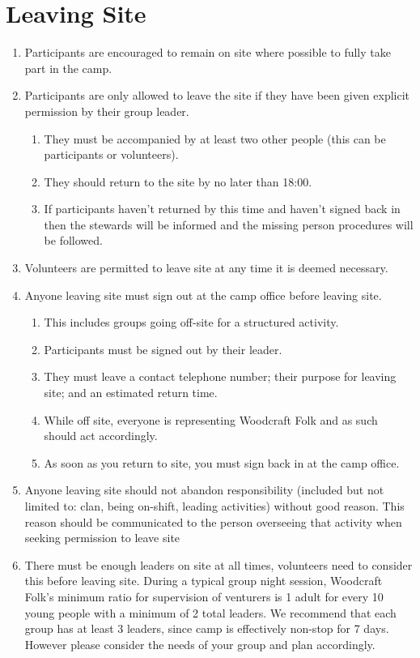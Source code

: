 \documentclass[a4paper, 11pt]{report}
\def\enumMarginIndentOne{4em}
\begin{document}
    \chapter{Leaving Site}
    \begin{enumerate}
        \item Participants are encouraged to remain on site where possible to fully take part in the camp.
        \item Participants are only allowed to leave the site if they have been given explicit permission by their group leader.
        \begin{enumerate}[leftmargin=\enumMarginIndentOne]
            \item They must be accompanied by at least two other people (this can be participants or volunteers).
            \item They should return to the site by no later than 18:00.
            \item If participants haven't returned by this time and haven't signed back in then the stewards will be informed and the missing person procedures will be followed.
        \end{enumerate}
        \item Volunteers are permitted to leave site at any time it is deemed necessary.
        \item Anyone leaving site must sign out at the camp office before leaving site.
        \begin{enumerate}[leftmargin=\enumMarginIndentOne]
            \item This includes groups going off-site for a structured activity.
            \item Participants must be signed out by their leader.
            \item They must leave a contact telephone number; their purpose for leaving site; and an estimated return time. 
            \item While off site, everyone is representing Woodcraft Folk and as such should act accordingly. 
            \item As soon as you return to site, you must sign back in at the camp office. 
        \end{enumerate}
        \item Anyone leaving site should not abandon responsibility (included but not limited to: clan, being on-shift, leading activities) without good reason. This reason should be communicated to the person overseeing that activity when seeking permission to leave site
        \item There must be enough leaders on site at all times, volunteers need to consider this before leaving site. During a typical group night session, Woodcraft Folk's minimum ratio for supervision of venturers is 1 adult for every 10 young people with a minimum of 2 total leaders. We recommend that each group has at least 3 leaders, since camp is effectively non-stop for 7 days. However please consider the needs of your group and plan accordingly.
    \end{enumerate}
\end{document}
